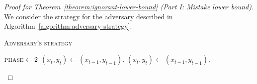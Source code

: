 \begin{proof}[Proof for Theorem~\ref{theorem:ignorant-lower-bound} (Part I: Mistake lower bound)]
We consider the strategy for the adversary described in Algorithm~\ref{algorithm:adversary-strategy}.
\begin{algorithm}[h]
\caption{\textsc{Adversary's strategy}}
\label{algorithm:adversary-strategy}
\begin{algorithmic}[1]
{
       \ELSE
          \STATE $\textsc{phase}\leftarrow 2$
       \ENDIF
       \STATE $(x_t, y_t)\leftarrow (x_{t-1}, y_{t-1})$.
    \ENDIF
\ENDFOR
{}
    \STATE $(x_t, y_t)\leftarrow (x_{t-1}, y_{t-1})$.
\ENDFOR


}
\end{algorithmic}
\end{algorithm}
\end{proof}
